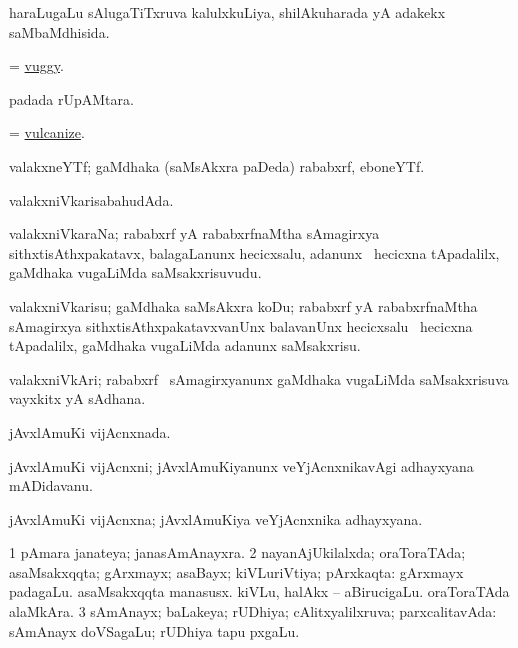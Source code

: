 \bentry 
{} 
\gl{\gu}
\expl{}
\bmng
 haraLugaLu sAlugaTiTxruva kalulxkuLiya, shilAkuharada yA adakekx saMbaMdhisida. 
\emng
\eentry

\bentry
{} 
\gl{\gu}
\expl{}
\bmng
 = \hyperlink{vuggy}{vuggy}. 
\emng
\eentry

\bentry 
{} 
\gl{\gu}
\expl{}
\bmng
  padada rUpAMtara. 
\emng
\eentry

\bentry
{} 
\gl{\sakirx}
\expl{}
\bmng
 = \hyperlink{vulcanize}{vulcanize}. 
\emng
\eentry

\bentry
{}
\gl{\nA}
\expl{}
\bmng
 valakxneYTf; gaMdhaka (saMsAkxra paDeda) rababxrf, eboneYTf. 
\emng
\eentry

\bentry 
{} 
\gl{\gu}
\expl{}
\bmng
 valakxniVkarisabahudAda. 
\emng
\eentry

\bentry 
{} 
\gl{\nA}
\expl{}
\bmng
 valakxniVkaraNa; rababxrf yA rababxrfnaMtha sAmagirxya sithxtisAthxpakatavx, balagaLanunx hecicxsalu, adanunx \kanmu\ hecicxna tApadalilx, gaMdhaka \mo vugaLiMda saMsakxrisuvudu. 
\emng
\eentry

\bentry
{} 
\gl{\sakirx}
\expl{}
\bmng
 valakxniVkarisu; gaMdhaka saMsAkxra koDu; rababxrf yA rababxrfnaMtha sAmagirxya sithxtisAthxpakatavxvanUnx balavanUnx hecicxsalu \kanmu\ hecicxna tApadalilx, gaMdhaka \mo vugaLiMda adanunx saMsakxrisu. 
\emng
\eentry

\bentry 
{} 
\gl{\nA}
\expl{}
\bmng
 valakxniVkAri; rababxrf \mo\ sAmagirxyanunx gaMdhaka \mo vugaLiMda saMsakxrisuva vayxkitx yA sAdhana. 
\emng
\eentry

\bentry
{} 
\gl{\gu}
\expl{}
\bmng
 jAvxlAmuKi vijAcnxnada. 
\emng
\eentry

\bentry
{} 
\gl{\nA}
\expl{}
\bmng
 jAvxlAmuKi vijAcnxni; jAvxlAmuKiyanunx veYjAcnxnikavAgi adhayxyana mADidavanu. 
\emng
\eentry

\bentry
{} 
\gl{\nA}
\expl{}
\bmng
 jAvxlAmuKi vijAcnxna; jAvxlAmuKiya veYjAcnxnika adhayxyana. 
\emng
\eentry

\bentry
{} 
\gl{\gu}
\expl{}
\bmng
\bnum
\num{1} pAmara janateya; janasAmAnayxra. 
\num{2} nayanAjUkilalxda; oraToraTAda; asaMsakxqqta; gArxmayx; asaBayx; kiVLuriVtiya; pArxkaqta:  gArxmayx padagaLu.  asaMsakxqqta manasusx.  kiVLu, halAkx -- aBirucigaLu.  oraToraTAda alaMkAra. 
\num{3} sAmAnayx; baLakeya; rUDhiya; cAlitxyalilxruva; parxcalitavAda:  sAmAnayx doVSagaLu; rUDhiya tapu pxgaLu. 
\enum
\emng

